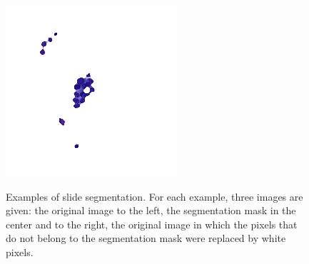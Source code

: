 \begin{figure}
{		\includegraphics[scale=0.5]{image/slide_segmentation_2_masked.png}
	} \\
	\caption{Examples of slide segmentation. For each example, three images are given: the original image to the left, the segmentation mask in the center and to the right, the original image in which the pixels that do not belong to the segmentation mask were replaced by white pixels.}
	\label{fig:first_seg_examples}
\end{figure}

